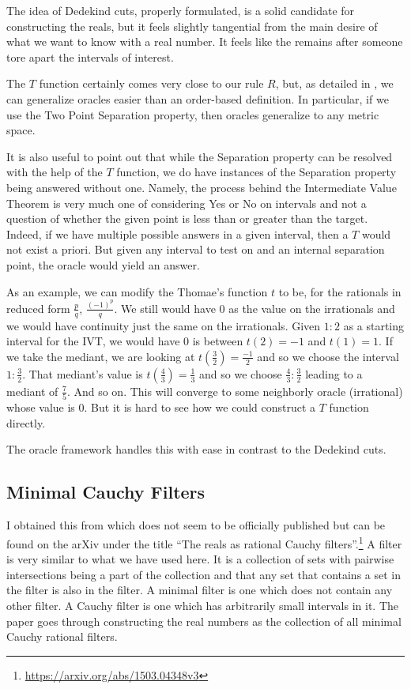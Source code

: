 \documentclass[12pt]{article}
\begin{document}
The idea of Dedekind cuts, properly formulated, is a solid candidate for constructing the reals, but it feels slightly tangential from the main desire of what we want to know with a real number. It feels like the remains after someone tore apart the intervals of interest. 

The $T$ function certainly comes very close to our rule $R$, but, as detailed in \cite{taylor23metric}, we can generalize oracles easier than an order-based definition. In particular, if we use the Two Point Separation property, then oracles generalize to any metric space. 

It is also useful to point out that while the Separation property can be resolved with the help of the $T$ function, we do have instances of the Separation property being answered without one. Namely, the process behind the Intermediate Value Theorem is very much one of considering Yes or No on intervals and not a question of whether the given point is less than or greater than the target. Indeed, if we have multiple possible answers in a given interval, then a $T$ would not exist a priori. But given any interval to test on and an internal separation point, the oracle would yield an answer. 

As an example, we can modify the Thomae's function $t$ to be, for the rationals in reduced form $\frac{p}{q}$, $\frac{(-1)^p}{q}$. We still would have $0$ as the value on the irrationals and we would have continuity just the same on the irrationals. Given $1:2$ as a starting interval for the IVT, we would have $0$ is between $t(2) = -1$ and $t(1) = 1$. If we take the mediant, we are looking at $t(\frac{3}{2}) = \frac{-1}{2}$ and so we choose the interval $1:\frac{3}{2}$. That mediant's value is $t(\frac{4}{3}) = \frac{1}{3}$ and so we choose $\frac{4}{3}:\frac{3}{2}$ leading to a mediant of $\frac{7}{5}$. And so on. This will converge to some neighborly oracle (irrational) whose value is $0$. But it is hard to see how we could construct a $T$ function directly.

The oracle framework handles this with ease in contrast to the Dedekind cuts.

\subsection{Minimal Cauchy Filters}\label{sec:mincauchy}

I obtained this from \cite{weiss2015reals} which does not seem to be officially published but can be found on the arXiv under the title ``The reals as rational Cauchy filters''.\footnote{\url{https://arxiv.org/abs/1503.04348v3}} A filter is very similar to what we have used here. It is a collection of sets with pairwise intersections being a part of the collection and that any set that contains a set in the filter is also in the filter. A minimal filter is one which does not contain any other filter. A Cauchy filter is one which has arbitrarily small intervals in it. The paper goes through constructing the real numbers as the collection of all minimal Cauchy rational filters. 
\end{document}
